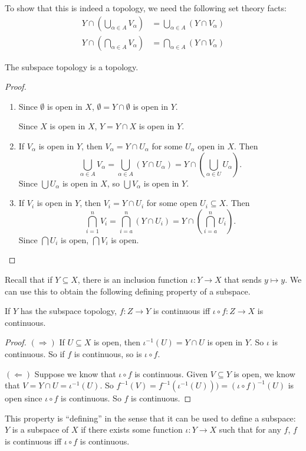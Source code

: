 \documentclass[a4paper]{article}
\begin{document}
To show that this is indeed a topology, we need the following set theory facts:
\begin{align*}
  Y\cap \left(\bigcup_{\alpha \in A}V_\alpha\right) &= \bigcup_{\alpha \in A}\left(Y\cap V_\alpha\right)\\
  Y\cap \left(\bigcap_{\alpha\in A}V_\alpha\right) &= \bigcap_{\alpha\in A}(Y\cap V_\alpha)
\end{align*}

\begin{prop}
  The subspace topology is a topology.
\end{prop}

\begin{proof}\leavevmode
  \begin{enumerate}
    \item Since $\emptyset$ is open in $X$, $\emptyset = Y\cap \emptyset$ is open in $Y$.

      Since $X$ is open in $X$, $Y = Y\cap X$ is open in $Y$.
    \item If $V_\alpha$ is open in $Y$, then $V_\alpha = Y\cap U_\alpha$ for some $U_\alpha$ open in $X$. Then
      \[
        \bigcup_{\alpha\in A}V_\alpha = \bigcup_{\alpha\in A}\left(Y\cap U_\alpha\right) = Y\cap \left(\bigcup_{\alpha\in U}U_\alpha\right).
      \]
      Since $\bigcup U_\alpha$ is open in $X$, so $\bigcup V_\alpha$ is open in $Y$.
    \item If $V_i$ is open in $Y$, then $V_i = Y\cap U_i$ for some open $U_i\subseteq X$. Then
      \[
        \bigcap_{i = 1}^n V_i = \bigcap_{i = a}^n \left(Y\cap U_i\right) = Y\cap \left(\bigcap_{i = a}^n U_i\right).
      \]
      Since $\bigcap U_i$ is open, $\bigcap V_i$ is open.
  \end{enumerate}
\end{proof}

Recall that if $Y\subseteq X$, there is an inclusion function $\iota: Y \to X$ that sends $y \mapsto y$. We can use this to obtain the following defining property of a subspace.
\begin{prop}
  If $Y$ has the subspace topology, $f: Z\to Y$ is continuous iff $\iota\circ f: Z\to X$ is continuous.
\end{prop}

\begin{proof}
  $(\Rightarrow)$ If $U\subseteq X$ is open, then $\iota^{-1}(U) = Y\cap U$ is open in $Y$. So $\iota$ is continuous. So if $f$ is continuous, so is $\iota\circ f$.

  $(\Leftarrow)$ Suppose we know that $\iota\circ f$ is continuous. Given $V\subseteq Y$ is open, we know that $V = Y \cap U = \iota^{-1}(U)$. So $f^{-1}(V) = f^{-1}(\iota^{-1}(U))) = (\iota\circ f)^{-1}(U)$ is open since $\iota\circ f$ is continuous. So $f$ is continuous.
\end{proof}
This property is ``defining'' in the sense that it can be used to define a subspace: $Y$ is a subspace of $X$ if there exists some function $\iota: Y \to X$ such that for any $f$, $f$ is continuous iff $\iota\circ f$ is continuous.
\end{document}

